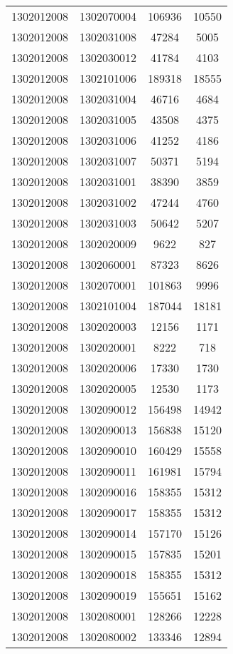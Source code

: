 \begin{longtable}[h]{llcc}
		1302012008 & 1302070004 & 106936 & 10550\\
		1302012008 & 1302031008 & 47284 & 5005\\
		1302012008 & 1302030012 & 41784 & 4103\\
		1302012008 & 1302101006 & 189318 & 18555\\
		1302012008 & 1302031004 & 46716 & 4684\\
		1302012008 & 1302031005 & 43508 & 4375\\
		1302012008 & 1302031006 & 41252 & 4186\\
		1302012008 & 1302031007 & 50371 & 5194\\
		1302012008 & 1302031001 & 38390 & 3859\\
		1302012008 & 1302031002 & 47244 & 4760\\
		1302012008 & 1302031003 & 50642 & 5207\\
		1302012008 & 1302020009 & 9622 & 827\\
		1302012008 & 1302060001 & 87323 & 8626\\
		1302012008 & 1302070001 & 101863 & 9996\\
		1302012008 & 1302101004 & 187044 & 18181\\
		1302012008 & 1302020003 & 12156 & 1171\\
		1302012008 & 1302020001 & 8222 & 718\\
		1302012008 & 1302020006 & 17330 & 1730\\
		1302012008 & 1302020005 & 12530 & 1173\\
		1302012008 & 1302090012 & 156498 & 14942\\
		1302012008 & 1302090013 & 156838 & 15120\\
		1302012008 & 1302090010 & 160429 & 15558\\
		1302012008 & 1302090011 & 161981 & 15794\\
		1302012008 & 1302090016 & 158355 & 15312\\
		1302012008 & 1302090017 & 158355 & 15312\\
		1302012008 & 1302090014 & 157170 & 15126\\
		1302012008 & 1302090015 & 157835 & 15201\\
		1302012008 & 1302090018 & 158355 & 15312\\
		1302012008 & 1302090019 & 155651 & 15162\\
		1302012008 & 1302080001 & 128266 & 12228\\
		1302012008 & 1302080002 & 133346 & 12894\\

\end{longtable}
